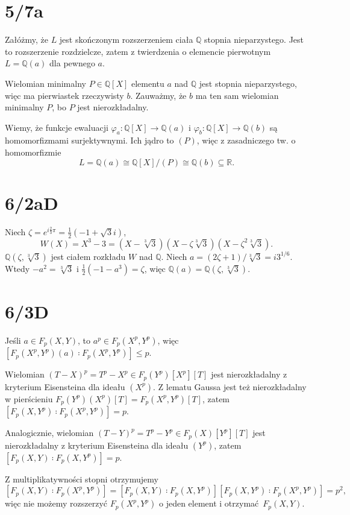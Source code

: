 \documentclass[a4paper, 12pt]{article}
\title{}
\author{Wiktor Kuchta}
\date{\vspace{-4ex}}
\newcommand{\+}{\enspace}
\begin{document}
\maketitle

\section*{5/7a}
Załóżmy, że $L$ jest skończonym rozszerzeniem ciała $ℚ$ stopnia nieparzystego.
Jest to rozszerzenie rozdzielcze,
zatem z twierdzenia o elemencie pierwotnym $L=ℚ(a)$ dla pewnego $a$. %

Wielomian minimalny $P∈ℚ[X]$ elementu $a$ nad $ℚ$ jest stopnia nieparzystego,
więc ma pierwiastek rzeczywisty $b$.
Zauważmy, że $b$ ma ten sam wielomian minimalny $P$, bo $P$ jest nierozkładalny.

Wiemy, że funkcje ewaluacji $φ_a: ℚ[X] → ℚ(a)$ i $φ_b: ℚ[X] → ℚ(b)$
są homomorfizmami surjektywnymi.
Ich jądro to $(P)$, więc z zasadniczego tw. o homomorfizmie
$$L = ℚ(a) ≅ ℚ[X]/(P) ≅ ℚ(b) ⊆ ℝ.$$

\section*{6/2aD}
Niech $ζ=e^{i\frac{2}{3}π} = \frac{1}{2}(-1+\sqrt{3}i)$,
$$W(X) = X^3-3 = (X-\sqrt[3]{3})(X-ζ\sqrt[3]{3})(X-ζ^2\sqrt[3]{3}).$$
$ℚ(ζ,\sqrt[3]{3})$ jest ciałem rozkładu $W$ nad $ℚ$.
Niech $a = (2ζ+1)/\sqrt[3]{3} = i3^{1/6}$.
Wtedy $-a^2 = \sqrt[3]{3}$ i $\frac{1}{2}(-1 - a^3) = ζ$,
więc $ℚ(a) = ℚ(ζ, \sqrt[3]{3})$.

\section*{6/3D}
Jeśli $a ∈ F_p(X,Y)$, to $a^p ∈ F_p(X^p, Y^p)$, więc ${[F_p(X^p, Y^p)(a) ∶ F_p(X^p, Y^p)] ≤ p}$.

Wielomian $ (T-X)^p = T^p-X^p ∈ F_p(Y^p)[X^p][T]$ jest nierozkładalny
z kryterium Eisensteina dla ideału $(X^p)$.
Z lematu Gaussa jest też nierozkładalny w pierścieniu $F_p(Y^p)(X^p)[T] = F_p(X^p,Y^p)[T]$,
zatem $[F_p(X,Y^p)∶ F_p(X^p,Y^p)]=p$.

Analogicznie, wielomian $(T-Y)^p = T^p-Y^p ∈ F_p(X)[Y^p][T]$ jest nierozkładalny
z kryterium Eisensteina dla ideału $(Y^p)$,
zatem $[F_p(X,Y)∶F_p(X,Y^p)]=p$.

Z multiplikatywności stopni otrzymujemy
$$[F_p(X,Y) ∶ F_p(X^p, Y^p)] = [F_p(X,Y) ∶ F_p(X, Y^p)][F_p(X, Y^p) ∶ F_p(X^p, Y^p)] = p^2,$$
więc nie możemy rozszerzyć $F_p(X^p,Y^p)$ o jeden element i otrzymać $F_p(X,Y)$.
\end{document}
